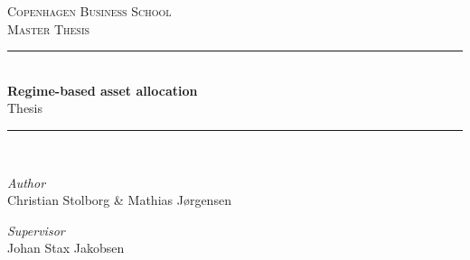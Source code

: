 

\begin{titlepage}

\newcommand{\HRule}{\rule{\linewidth}{0.5mm}} %



    


\begin{center}
    


\textsc{\Large Copenhagen Business School}\\[0.5cm] 
\textsc{\large Master Thesis}\\[0.5cm] 


\HRule \\[0.4cm]
{ \huge \bfseries Regime-based asset allocation}\\
{\Large Thesis} 
\HRule \\[1.5cm]


\end{center}


\begin{center}
    \large
    \textit{Author}\\
    Christian Stolborg \& Mathias Jørgensen
    
    \textit{Supervisor}\\
    Johan Stax Jakobsen
\end{center}

\vspace{2cm}



\end{titlepage}
